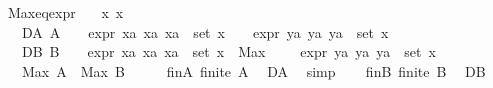\begin{isabellebody}
\isanewline
\isanewline
{}\isamarkupfalse%
\ Max{\isacharunderscore}{\kern0pt}eq{\isacharunderscore}{\kern0pt}expr{\isacharunderscore}{\kern0pt}{}{\isacharcolon}{\kern0pt}\isanewline
\ \ \ x{}\ x{}\isanewline
\ \ \ DA{\isacharcolon}{\kern0pt}\ {\isachardoublequoteopen}A\ {\isasymequiv}\ {\isacharbraceleft}{\kern0pt}{}{\isacharbraceright}{\kern0pt}\ {\isasymunion}\ {\isacharbraceleft}{\kern0pt}expr{\isacharunderscore}{\kern0pt}{}\ xa\ {\isacharbar}{\kern0pt}xa{\isachardot}{\kern0pt}\ xa\ {\isasymin}\ set\ x{}{\isacharbraceright}{\kern0pt}\ {\isasymunion}\ {\isacharbraceleft}{\kern0pt}{}\ {\isacharplus}{\kern0pt}\ expr{\isacharunderscore}{\kern0pt}{}\ ya\ {\isacharbar}{\kern0pt}ya{\isachardot}{\kern0pt}\ ya\ {\isasymin}\ set\ x{}{\isacharbraceright}{\kern0pt}{\isachardoublequoteclose}\isanewline
\ \ \ DB{\isacharcolon}{\kern0pt}\ {\isachardoublequoteopen}B\ {\isasymequiv}\ {\isacharbraceleft}{\kern0pt}{}{\isacharbraceright}{\kern0pt}\ {\isasymunion}\ {\isacharbraceleft}{\kern0pt}expr{\isacharunderscore}{\kern0pt}{}\ xa\ {\isacharbar}{\kern0pt}xa{\isachardot}{\kern0pt}\ xa\ {\isasymin}\ set\ x{}{\isacharbraceright}{\kern0pt}\ {\isasymunion}\ {\isacharbraceleft}{\kern0pt}Max\ {\isacharparenleft}{\kern0pt}{\isacharbraceleft}{\kern0pt}{}{\isacharbraceright}{\kern0pt}\ {\isasymunion}\ {\isacharbraceleft}{\kern0pt}{}\ {\isacharplus}{\kern0pt}\ expr{\isacharunderscore}{\kern0pt}{}\ ya\ {\isacharbar}{\kern0pt}ya{\isachardot}{\kern0pt}\ ya\ {\isasymin}\ set\ x{}{\isacharbraceright}{\kern0pt}{\isacharparenright}{\kern0pt}{\isacharbraceright}{\kern0pt}{\isachardoublequoteclose}\isanewline
\ \ \ {\isachardoublequoteopen}Max\ A\ {\isacharequal}{\kern0pt}\ Max\ B{\isachardoublequoteclose}\isanewline
%
\isadelimproof
%
\endisadelimproof
%
\isatagproof
{}\isamarkupfalse%
{\isacharminus}{\kern0pt}\ \isanewline
\ \ \isamarkupfalse%
\ fin{\isacharunderscore}{\kern0pt}A{\isacharcolon}{\kern0pt}\ {\isachardoublequoteopen}finite\ A{\isachardoublequoteclose}\ \isamarkupfalse%
\ DA\ \isamarkupfalse%
\ simp\isanewline
\isanewline
\ \ \isamarkupfalse%
\ fin{\isacharunderscore}{\kern0pt}B{\isacharcolon}{\kern0pt}\ {\isachardoublequoteopen}finite\ B{\isachardoublequoteclose}\ \isamarkupfalse%
\ DB\ \isamarkupfalse%

\end{isabellebody}
